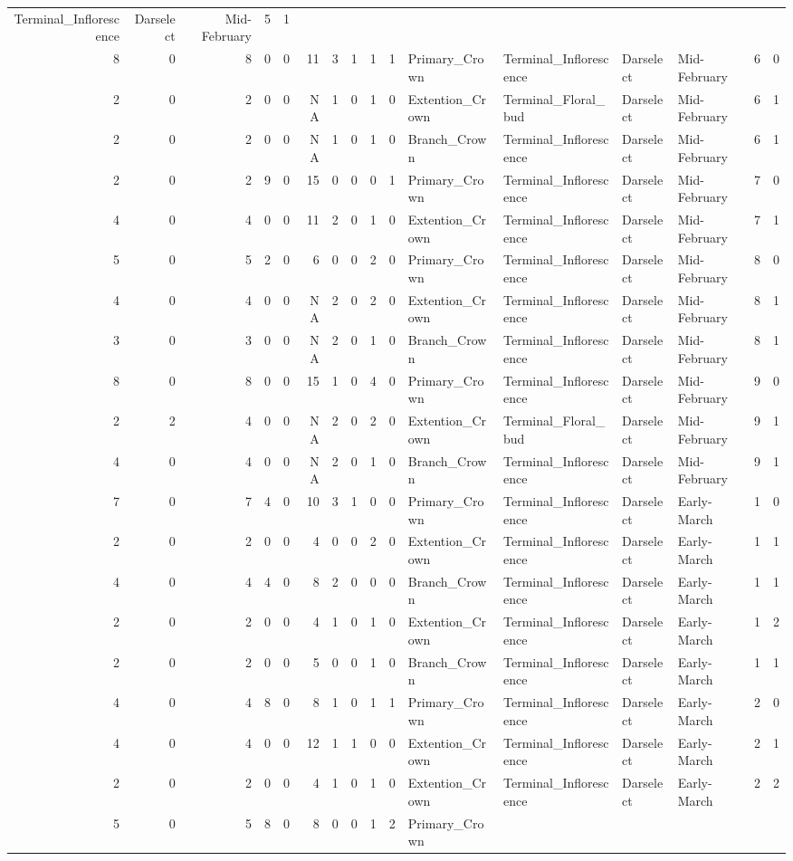 \documentclass[]{article}
\begin{document}
\begin{longtable}[]{@{}rrrrrrrrrrllllrl@{}}
Terminal\_Inflorescence & Darselect & Mid-February & 5 &
1\tabularnewline
8 & 0 & 8 & 0 & 0 & 11 & 3 & 1 & 1 & 1 & Primary\_Crown &
Terminal\_Inflorescence & Darselect & Mid-February & 6 &
0\tabularnewline
2 & 0 & 2 & 0 & 0 & NA & 1 & 0 & 1 & 0 & Extention\_Crown &
Terminal\_Floral\_bud & Darselect & Mid-February & 6 & 1\tabularnewline
2 & 0 & 2 & 0 & 0 & NA & 1 & 0 & 1 & 0 & Branch\_Crown &
Terminal\_Inflorescence & Darselect & Mid-February & 6 &
1\tabularnewline
2 & 0 & 2 & 9 & 0 & 15 & 0 & 0 & 0 & 1 & Primary\_Crown &
Terminal\_Inflorescence & Darselect & Mid-February & 7 &
0\tabularnewline
4 & 0 & 4 & 0 & 0 & 11 & 2 & 0 & 1 & 0 & Extention\_Crown &
Terminal\_Inflorescence & Darselect & Mid-February & 7 &
1\tabularnewline
5 & 0 & 5 & 2 & 0 & 6 & 0 & 0 & 2 & 0 & Primary\_Crown &
Terminal\_Inflorescence & Darselect & Mid-February & 8 &
0\tabularnewline
4 & 0 & 4 & 0 & 0 & NA & 2 & 0 & 2 & 0 & Extention\_Crown &
Terminal\_Inflorescence & Darselect & Mid-February & 8 &
1\tabularnewline
3 & 0 & 3 & 0 & 0 & NA & 2 & 0 & 1 & 0 & Branch\_Crown &
Terminal\_Inflorescence & Darselect & Mid-February & 8 &
1\tabularnewline
8 & 0 & 8 & 0 & 0 & 15 & 1 & 0 & 4 & 0 & Primary\_Crown &
Terminal\_Inflorescence & Darselect & Mid-February & 9 &
0\tabularnewline
2 & 2 & 4 & 0 & 0 & NA & 2 & 0 & 2 & 0 & Extention\_Crown &
Terminal\_Floral\_bud & Darselect & Mid-February & 9 & 1\tabularnewline
4 & 0 & 4 & 0 & 0 & NA & 2 & 0 & 1 & 0 & Branch\_Crown &
Terminal\_Inflorescence & Darselect & Mid-February & 9 &
1\tabularnewline
7 & 0 & 7 & 4 & 0 & 10 & 3 & 1 & 0 & 0 & Primary\_Crown &
Terminal\_Inflorescence & Darselect & Early-March & 1 & 0\tabularnewline
2 & 0 & 2 & 0 & 0 & 4 & 0 & 0 & 2 & 0 & Extention\_Crown &
Terminal\_Inflorescence & Darselect & Early-March & 1 & 1\tabularnewline
4 & 0 & 4 & 4 & 0 & 8 & 2 & 0 & 0 & 0 & Branch\_Crown &
Terminal\_Inflorescence & Darselect & Early-March & 1 & 1\tabularnewline
2 & 0 & 2 & 0 & 0 & 4 & 1 & 0 & 1 & 0 & Extention\_Crown &
Terminal\_Inflorescence & Darselect & Early-March & 1 & 2\tabularnewline
2 & 0 & 2 & 0 & 0 & 5 & 0 & 0 & 1 & 0 & Branch\_Crown &
Terminal\_Inflorescence & Darselect & Early-March & 1 & 1\tabularnewline
4 & 0 & 4 & 8 & 0 & 8 & 1 & 0 & 1 & 1 & Primary\_Crown &
Terminal\_Inflorescence & Darselect & Early-March & 2 & 0\tabularnewline
4 & 0 & 4 & 0 & 0 & 12 & 1 & 1 & 0 & 0 & Extention\_Crown &
Terminal\_Inflorescence & Darselect & Early-March & 2 & 1\tabularnewline
2 & 0 & 2 & 0 & 0 & 4 & 1 & 0 & 1 & 0 & Extention\_Crown &
Terminal\_Inflorescence & Darselect & Early-March & 2 & 2\tabularnewline
5 & 0 & 5 & 8 & 0 & 8 & 0 & 0 & 1 & 2 & Primary\_Crown &

\end{longtable}
\end{document}
